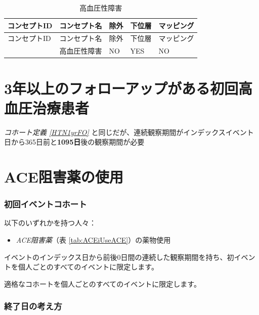 \documentclass[
  11pt]{book}
\providecommand{\tightlist}{%
  \setlength{\itemsep}{0pt}\setlength{\parskip}{0pt}}
\theoremstyle{definition}
\theoremstyle{definition}
\theoremstyle{definition}
\theoremstyle{definition}
\theoremstyle{remark}
\begin{document}
\begin{longtable}[]{@{}lllll@{}}
\caption{\label{tab:HTN1yrFOHypertensiveDisorder} 高血圧性障害}\tabularnewline
\toprule\noalign{}
コンセプトID & コンセプト名 & 除外 & 下位層 & マッピング \\
\midrule\noalign{}
\endfirsthead
\toprule\noalign{}
コンセプトID & コンセプト名 & 除外 & 下位層 & マッピング \\
\midrule\noalign{}
\endhead
\bottomrule\noalign{}
\endlastfoot
316866 & 高血圧性障害 & NO & YES & NO \\
\end{longtable}

\section{3年以上のフォローアップがある初回高血圧治療患者}\label{HTN3yrFO}

\emph{コホート定義 \ref{HTN1yrFO}} と同じだが、連続観察期間がインデックスイベント日から365日前と\textbf{1095日}後の観察期間が必要

\section{ACE阻害薬の使用}\label{ACEiUse}

\subsubsection*{初回イベントコホート}\label{ux521dux56deux30a4ux30d9ux30f3ux30c8ux30b3ux30dbux30fcux30c8-1}

以下のいずれかを持つ人々：

\begin{itemize}
\tightlist
\item
  \emph{ACE阻害薬}（表 \ref{tab:ACEiUseACE}）の薬物使用
\end{itemize}

イベントのインデックス日から前後0日間の連続した観察期間を持ち、初イベントを個人ごとのすべてのイベントに限定します。

適格なコホートを個人ごとのすべてのイベントに限定します。

\subsubsection*{終了日の考え方}\label{ux7d42ux4e86ux65e5ux306eux8003ux3048ux65b9-4}
\end{document}
